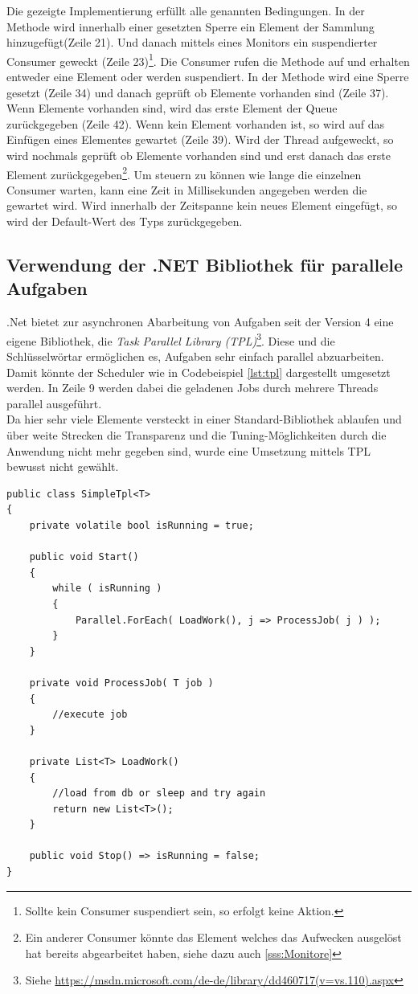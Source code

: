 Die gezeigte Implementierung erfüllt alle genannten Bedingungen. In der Methode  wird innerhalb einer gesetzten Sperre ein Element der Sammlung hinzugefügt(Zeile 21). Und danach mittels eines Monitors ein suspendierter Consumer geweckt (Zeile 23)\footnote{Sollte kein Consumer suspendiert sein, so erfolgt keine Aktion.}. 
Die Consumer rufen die Methode  auf und erhalten entweder eine Element oder werden suspendiert. In der Methode wird eine Sperre gesetzt (Zeile 34) und danach geprüft ob Elemente vorhanden sind (Zeile 37). Wenn Elemente vorhanden sind, wird das erste Element der Queue zurückgegeben (Zeile 42). Wenn kein Element vorhanden ist, so wird auf das Einfügen eines Elementes gewartet (Zeile 39). Wird der Thread aufgeweckt, so wird nochmals geprüft ob Elemente vorhanden sind und erst danach das erste Element zurückgegeben\footnote{Ein anderer Consumer könnte das Element welches das Aufwecken ausgelöst hat bereits abgearbeitet haben, siehe dazu auch \ref{sss:Monitore}}. Um steuern zu können wie lange die einzelnen Consumer warten, kann eine Zeit in Millisekunden angegeben werden die gewartet wird. Wird innerhalb der Zeitspanne kein neues Element eingefügt, so wird der Default-Wert des Typs zurückgegeben.
 
\subsection{Verwendung der .NET Bibliothek für parallele Aufgaben}
.Net bietet zur asynchronen Abarbeitung von Aufgaben seit der Version 4 eine eigene Bibliothek, die \emph{Task Parallel Library (TPL)}\footnote{Siehe \url{https://msdn.microsoft.com/de-de/library/dd460717(v=vs.110).aspx}}. Diese und die Schlüsselwörtar  ermöglichen es, Aufgaben sehr einfach parallel abzuarbeiten. Damit könnte der Scheduler wie in Codebeispiel \ref{lst:tpl} dargestellt umgesetzt werden. In Zeile 9 werden dabei die geladenen Jobs durch mehrere Threads parallel  ausgeführt.
\\Da hier sehr viele Elemente versteckt in einer Standard-Bibliothek ablaufen und über weite Strecken die Transparenz und die Tuning-Möglichkeiten durch die Anwendung nicht mehr gegeben sind, wurde eine Umsetzung mittels TPL bewusst nicht gewählt.

\begin{lstlisting}[caption={JobScheduler, einfache TPL Implementierung, siehe SimpleTpl.cs}, label={lst:tpl}, captionpos=b]
public class SimpleTpl<T>
{
	private volatile bool isRunning = true;
	
	public void Start()
	{
		while ( isRunning )
		{
			Parallel.ForEach( LoadWork(), j => ProcessJob( j ) );
		}
	}
	
	private void ProcessJob( T job )
	{
		//execute job
	}
	
	private List<T> LoadWork()
	{
		//load from db or sleep and try again
		return new List<T>();
	}
	
	public void Stop() => isRunning = false;
}
\end{lstlisting}
\chapterend
